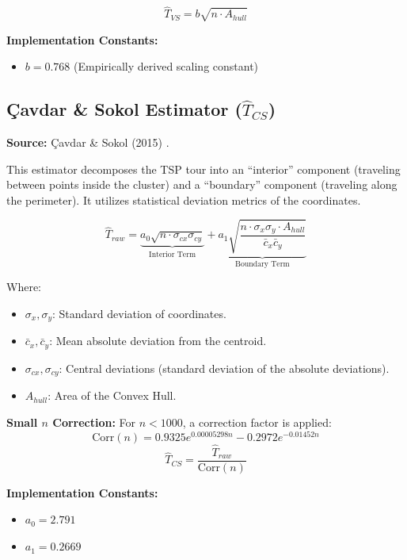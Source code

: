 \documentclass{article}
\begin{document}
\begin{equation}
    \hat{T}_{VS} = b \sqrt{n \cdot A_{hull}}
\end{equation}

\noindent \textbf{Implementation Constants:}
\begin{itemize}
    \item $b = 0.768$ (Empirically derived scaling constant)
\end{itemize}

\subsection{Çavdar \& Sokol Estimator ($\hat{T}_{CS}$)}
\textbf{Source:} Çavdar \& Sokol (2015) \cite{cavdar2015}.

This estimator decomposes the TSP tour into an ``interior'' component (traveling between points inside the cluster) and a ``boundary'' component (traveling along the perimeter). It utilizes statistical deviation metrics of the coordinates.

\begin{equation}
    \hat{T}_{raw} = \underbrace{a_0 \sqrt{n \cdot \sigma_{cx} \sigma_{cy}}}_{\text{Interior Term}} + \underbrace{a_1 \sqrt{\frac{n \cdot \sigma_x \sigma_y \cdot A_{hull}}{\bar{c}_x \bar{c}_y}}}_{\text{Boundary Term}}
\end{equation}

\noindent Where:
\begin{itemize}
    \item $\sigma_{x}, \sigma_{y}$: Standard deviation of coordinates.
    \item $\bar{c}_{x}, \bar{c}_{y}$: Mean absolute deviation from the centroid.
    \item $\sigma_{cx}, \sigma_{cy}$: Central deviations (standard deviation of the absolute deviations).
    \item $A_{hull}$: Area of the Convex Hull.
\end{itemize}

\noindent \textbf{Small $n$ Correction:} For $n < 1000$, a correction factor is applied:
\begin{equation}
    \text{Corr}(n) = 0.9325 e^{0.00005298 n} - 0.2972 e^{-0.01452 n}
\end{equation}
\begin{equation}
    \hat{T}_{CS} = \frac{\hat{T}_{raw}}{\text{Corr}(n)}
\end{equation}

\noindent \textbf{Implementation Constants:}
\begin{itemize}
    \item $a_0 = 2.791$
    \item $a_1 = 0.2669$
\end{itemize}
\end{document}
